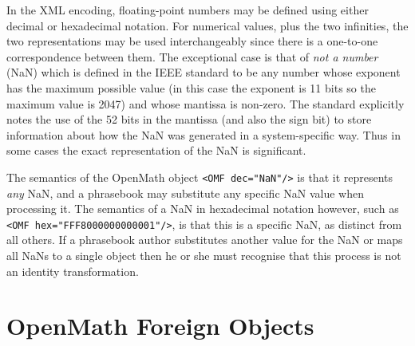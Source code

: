 \documentclass{report}
\def\OM{OpenMath\xspace}
\def\XML{XML\xspace}
\begin{document}
In the \XML encoding, floating-point numbers may be defined using either decimal or
hexadecimal notation.  For numerical values, plus the two infinities, the two
representations may be used interchangeably since there is a one-to-one correspondence
between them.  The exceptional case is that of \emph{not a number} (NaN) which is defined
in the IEEE standard \cite{ieee754_85} to be any number whose exponent has the maximum
possible value (in this case the exponent is 11 bits so the maximum value is 2047) and
whose mantissa is non-zero.  The standard explicitly notes the use of the 52 bits in the
mantissa (and also the sign bit) to store information about how the NaN was generated in a
system-specific way.  Thus in some cases the exact representation of the NaN is
significant.

The semantics of the \OM object \lstinline|<OMF dec="NaN"/>| is that it represents
\emph{any} NaN, and a phrasebook may substitute any specific NaN value when processing it.
The semantics of a NaN in hexadecimal notation however, such as 
\lstinline|<OMF hex="FFF8000000000001"/>|, is that this is a specific NaN, as distinct from all others.
If a phrasebook author substitutes another value for the NaN or maps all NaNs to a single
object then he or she must recognise that this process is not an identity transformation.

\section{\OM Foreign Objects}\label{sec_compl_omforeign}
\end{document}
